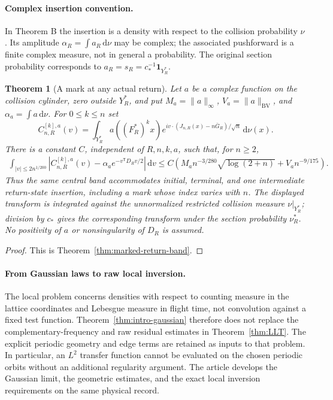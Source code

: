 \documentclass[11pt,reqno]{amsart}
\numberwithin{equation}{section}
\newtheorem{maintheorem}{Theorem}
\theoremstyle{definition}\newtheorem{definition}[theorem]{Definition}
\theoremstyle{remark}\newtheorem{remark}[theorem]{Remark}
\newcommand{\dd}{\,\mathrm d}\newcommand{\one}{\mathbf1}
\begin{document}
\paragraph{Complex insertion convention.}
In Theorem B the insertion is a density with respect to the collision
probability $\nu$. Its amplitude $\alpha_R=\int a_R\dd\nu$ may be
complex; the associated pushforward is a finite complex measure, not
in general a probability. The original section probability corresponds
to $a_R=s_R=c_*^{-1}\one_{Y_R^*}$.

\begin{maintheorem}[A mark at any actual return]
\label{thm:intro-marked-return}
Let $a$ be a complex function on the collision cylinder, zero outside
$Y_R^*$, and put $M_a=\|a\|_\infty$, $V_a=\|a\|_{\mathrm{BV}}$,
and $\alpha_a=\int a\dd\nu$. For $0\le k\le n$ set
\[
 C^{[k],a}_{n,R}(v)=\int_{Y_R^*}a((F_R^*)^k x)
       e^{iv\cdot(J_{n,R}(x)-n\bar G_R)/\sqrt n}\dd\nu(x).
\]
There is a constant $C$, independent of $R,n,k,a$, such that, for $n\ge2$,
\begin{align*}
 \int_{|v|\le2n^{1/200}}
 \left|C^{[k],a}_{n,R}(v)-\alpha_a e^{-v^{\mathsf T}D_Rv/2}\right|\dd v
 \le C\left(M_an^{-3/280}\sqrt{\log(2+n)}+V_an^{-9/175}\right).
\end{align*}
Thus the same central band accommodates initial, terminal, and one
intermediate return-state insertion, including a mark whose index
varies with $n$. The displayed transform is integrated against the
unnormalized restricted collision measure $\nu|_{Y_R^*}$; division by
$c_*$ gives the corresponding transform under the section probability
$\nu_R^*$. No positivity of $a$ or nonsingularity of $D_R$ is assumed.
\end{maintheorem}
\begin{proof}
This is Theorem~\ref{thm:marked-return-band}.
\end{proof}

\paragraph{From Gaussian laws to raw local inversion.}
The local problem concerns densities with respect to counting measure
in the lattice coordinates and Lebesgue measure in flight time, not
convolution against a fixed test function. Theorem~\ref{thm:intro-gaussian}
therefore does not replace the complementary-frequency and raw residual
estimates in Theorem~\ref{thm:LLT}. The explicit periodic geometry
and edge terms are retained as inputs to that problem. In particular,
an $L^2$ transfer function cannot be evaluated on the chosen periodic
orbits without an additional regularity argument. The article develops
the Gaussian limit, the geometric estimates, and the exact local
inversion requirements on the same physical record.
\end{document}
